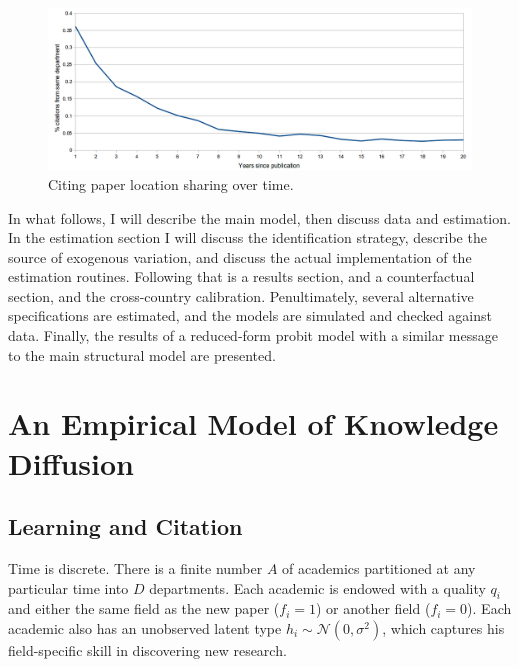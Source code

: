\begin{figure}[!ht]
    \centering
    \includegraphics[scale=0.35]{pics/raw_diffusion.png}
    \caption{Citing paper location sharing over time.}
    \label{fig:rawdiffusion}
\end{figure}

In what follows, I will describe the main model, then discuss data and
estimation. In the estimation section I will discuss the identification
strategy, describe the source of exogenous variation, and discuss the
actual implementation of the estimation routines. Following that is a
results section, and a counterfactual section, and the cross-country calibration.
Penultimately, several alternative
specifications are estimated, and the models are simulated and checked
against data.  Finally, the results of a reduced-form probit model with a similar 
message to the main structural model are presented.

\section{An Empirical Model of Knowledge Diffusion}
\label{sec:model}

\subsection{Learning and Citation}
\label{sec:learncit}

Time is discrete. There is a finite number $A$ of academics partitioned
at any particular time into $D$ departments. Each academic is endowed with a quality
$q_i$ and either the same field as the new paper ($f_i = 1$) or another
field ($f_i = 0$). Each academic also has an unobserved latent type
$h_i \sim \mathcal{N}(0,\sigma^2)$, which captures his field-specific
skill in discovering new research.


